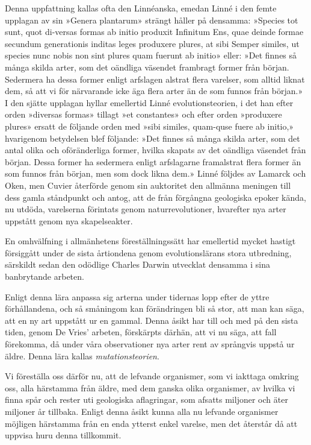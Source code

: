 \documentclass[a4paper, 12pt, oneside, swedish]{article}
\begin{document}
Denna uppfattning kallas ofta den Linnéanska, emedan Linné i den femte upplagan av sin »Genera plantarum» strängt håller på densamma: »Species tot sunt, quot di-versas formas ab initio produxit Infinitum Ens, quae deinde formae secundum generationis inditas leges produxere plures, at sibi Semper similes, ut species nunc nobis non sint plures quam fuerunt ab initio» eller: »Det finnes så många skilda arter, som det oändliga väsendet frambragt former från början. Sedermera ha dessa former enligt arfslagen alstrat flera varelser, som alltid liknat dem, så att vi för närvarande icke äga flera arter än de som funnos från början.» I den sjätte upplagan hyllar emellertid Linné evolutionsteorien, i det han efter orden »diversas formas» tillagt »et constantes» och efter orden »produxere plures» ersatt de följande orden med »sibi similes, quam-quse fuere ab initio,» hvarigenom betydelsen blef följande: »Det finnes så många skilda arter, som det antal olika och oföränderliga former, hvilka skapats av det oändliga väsendet från början. Dessa former ha sedermera enligt arfslagarne framalstrat flera former än som funnos från början, men som dock likna dem.» Linné följdes av Lamarck och Oken, men Cuvier återförde genom sin auktoritet den allmänna meningen till dess gamla ståndpunkt och antog, att de från förgångna geologiska epoker kända, nu utdöda, varelserna förintats genom naturrevolutioner, hvarefter nya arter uppstått genom nya skapelseakter.

En omhvälfning i allmänhetens föreställningssätt har emellertid mycket hastigt försiggått under de sista årtiondena genom evolutionslärans stora utbredning, särskildt sedan den odödlige Charles Darwin utvecklat densamma i sina banbrytande arbeten.

Enligt denna lära anpassa sig arterna under tidernas lopp efter de yttre förhållandena, och så småningom kan förändringen bli så stor, att man kan säga, att en ny art uppstått ur en gammal. Denna åsikt har till och med på den sista tiden, genom De Vries' arbeten, förskärpts därhän, att vi nu säga, att fall förekomma, då under våra observationer nya arter rent av språngvis uppstå ur äldre. Denna lära kallas \emph{mutationsteorien}.

Vi föreställa oss därför nu, att de lefvande organismer, som vi iakttaga omkring oss, alla härstamma från äldre, med dem ganska olika organismer, av hvilka vi finna spår och rester uti geologiska aflagringar, som afsatts miljoner och äter miljoner år tillbaka. Enligt denna åsikt kunna alla nu lefvande organismer möjligen härstamma från en enda ytterst enkel varelse, men det återstår då att uppvisa huru denna tillkommit.
\end{document}
